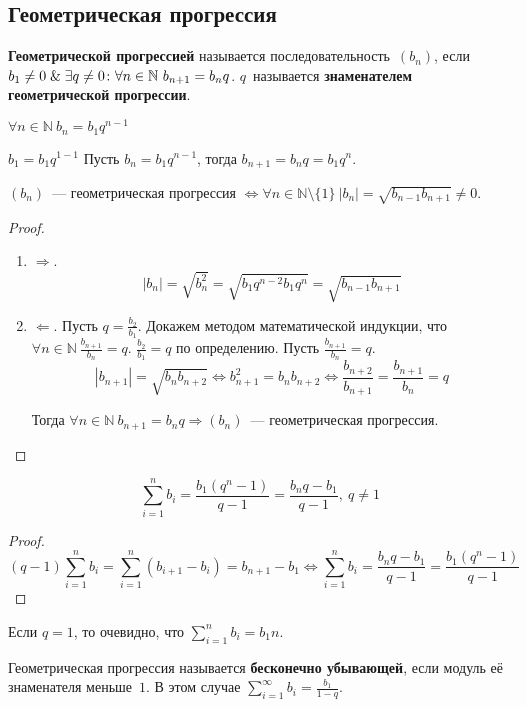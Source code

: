 \subsection{Геометрическая прогрессия}
 \textbf{Геометрической прогрессией} называется последовательность~$(b_n)$, если $b_1 \neq 0 \mathrel{\&} \exists q \neq 0 \colon \forall n \in \mathbb N \ b_{n+1} = b_n q$.
$q$~называется \textbf{знаменателем геометрической прогрессии}.

\begin{statement}
$\forall n \in \mathbb N \ b_n = b_1 q^{n-1}$
\end{statement}
\begin{proofmathind}
	\indbase $b_1 = b_1 q^{1-1}$
	\indstep Пусть $b_n = b_1 q^{n-1}$, тогда $b_{n+1} = b_n q = b_1 q^n$. \indend
\end{proofmathind}

\begin{theorem}
$(b_n)$~--- геометрическая прогрессия $\Leftrightarrow \forall n \in \mathbb N \setminus \{ 1 \} \ |b_n| = \sqrt{b_{n-1} b_{n+1}} \neq 0$.
\end{theorem}
\begin{proof}
\begin{enumerate}
	\item $\Rightarrow$.
	\begin{equation*}
	|b_n| = \sqrt{b_n^2} =
	\sqrt{b_1 q^{n-2} b_1 q^n} =
	\sqrt{b_{n-1} b_{n+1}}
	\end{equation*}
	
	\item $\Leftarrow$. Пусть $q = \frac{b_2}{b_1}$.
	Докажем методом математической индукции, что $\forall n \in \mathbb N \ \frac{b_{n+1}}{b_n} = q$.
		\indbase $\frac{b_2}{b_1} = q$ по определению.
		\indstep Пусть $\frac{b_{n+1}}{b_n} = q$.
		\begin{equation*}
		|b_{n+1}| = \sqrt{b_n b_{n+2}} \Leftrightarrow
		b_{n+1}^2 = b_n b_{n+2} \Leftrightarrow
		\frac{b_{n+2}}{b_{n+1}} = \frac{b_{n+1}}{b_n} = q
		\end{equation*}
		\indend
		
	Тогда $\forall n \in \mathbb N \ b_{n+1} = b_n q \Rightarrow (b_n)$~--- геометрическая прогрессия.
\end{enumerate}
\end{proof}

\begin{theorem}
\begin{equation*}
\sum_{i=1}^n b_i = \frac{b_1(q^n - 1)}{q - 1} = \frac{b_n q - b_1}{q - 1}, \ q \neq 1
\end{equation*}
\end{theorem}
\begin{proof}
\begin{equation*}
(q - 1) \sum_{i=1}^n b_i =
\sum_{i=1}^n (b_{i+1} - b_i) =
b_{n+1} - b_1 \Leftrightarrow
\sum_{i=1}^n b_i = \frac{b_n q - b_1}{q - 1} = \frac{b_1(q^n - 1)}{q - 1}
\end{equation*}
\end{proof}

Если $q = 1$, то очевидно, что $\displaystyle \sum_{i=1}^n b_i = b_1 n$.

Геометрическая прогрессия называется \textbf{бесконечно убывающей}, если модуль её знаменателя меньше~$1$.
В этом случае $\displaystyle \sum_{i=1}^\infty b_i = \frac{b_1}{1 - q}$.